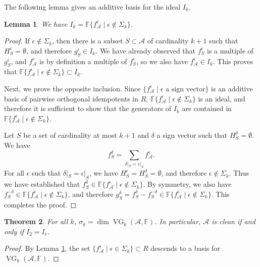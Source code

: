 \documentclass[11pt]{article}
\newtheorem{theorem}{Theorem}[section]
\newtheorem{lemma}[theorem]{Lemma}
\theoremstyle{definition}
\renewcommand{\dim}{\operatorname{dim}}
\newcommand{\eps}{\epsilon}
\newcommand{\F}{\mathbb{F}}
\newcommand{\<}{\left<}
\renewcommand{\>}{\right>}
\newcommand{\cA}{\mathcal{A}}
\newcommand{\cS}{S}
\newcommand{\VG}{\operatorname{VG}}
\begin{document}
The following lemma gives an additive basis for the ideal $I_k$.

\begin{lemma}\label{basis}
We have $I_k = \F\{f_\cA^\eps\mid \eps\notin\Sigma_k\}$.
\end{lemma}

\begin{proof}
If $\eps\notin\Sigma_k$, then there is a subset $\cS\subset \cA$ of cardinality $k+1$ such that $H_\cS^\eps=\emptyset$, and
therefore $g_\cS^\eps\in I_k$.  We have already observed that $f_\cS^\eps$ is a multiple of $g_\cS^\eps$, and $f_\cA^\eps$
is by definition a multiple of $f_\cS^\eps$, so we also have $f_\cA^\eps\in I_k$.  This proves that $\F\{f_\cA^\eps\mid \eps\notin\Sigma_k\}\subset I_k$.

Next, we prove the opposite inclusion.  Since $\{f_\cA^\eps\mid \text{$\eps$ a sign vector}\}$
is an additive basis of pairwise orthogonal idempotents in $R$, $\F\{f_\cA^\eps\mid \eps\notin\Sigma_k\}$ is an ideal, and therefore it is sufficient to show that
the generators of $I_k$ are contained in $\F\{f_\cA^\eps\mid \eps\notin\Sigma_k\}$.

Let $\cS$ be a set of cardinality at most $k+1$ and $\delta$ a sign vector such that $H_\cS^\delta = \emptyset$.
We have
\[f_\cS^\delta = \sum_{\delta|_\cS = \eps|_\cS} f_\cA^\eps.
\]
For all $\eps$ such that $\delta|_\cS = \eps|_\cS$, we have $H_\cS^\eps = H_\cS^\delta = \emptyset$, and therefore $\eps\notin\Sigma_k$.
Thus we have established that $f_\cS^\delta\in \F\{f_\cA^\eps\mid \eps\notin\Sigma_k\}$.  By symmetry, we also have $f_\cS^{-\delta}\in\F\{f_\cA^\eps\mid \eps\notin\Sigma_k\}$,
and therefore $g_\cS^\delta = f_S^\delta - f_S^{-\delta} \in \F\{f_\cA^\eps\mid \eps\notin\Sigma_k\}$.  This completes the proof.
\end{proof}

\begin{theorem}\label{main}
For all $k$, $\sigma_k = \dim \VG_k(\cA,\F)$.  In particular, $\cA$ is clean if and only if $I_2 = I_r$.
\end{theorem}

\begin{proof}
By Lemma \ref{basis}, the set $\{f_\cA^\eps\mid\eps\in\Sigma_k\}\subset R$ descends to a basis for $\VG_k(\cA,\F)$.
\end{proof}
\end{document}
